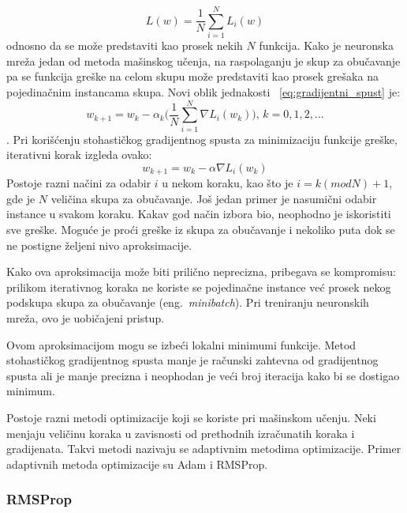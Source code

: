 \begin{equation}
		L(w) = \frac{1}{N}\sum_{i=1}^{N} L_i(w)	
\end{equation}
odnosno da se može predstaviti kao prosek nekih $N$ funkcija. Kako je neuronska mreža jedan od metoda mašinskog učenja, na raspolaganju je skup za obučavanje pa se funkcija greške na celom skupu može predstaviti kao prosek grešaka na pojedinačnim instancama skupa. Novi oblik 
jednakosti ~\eqref{eq:gradijentni_spust} je:
\begin{equation}
	w_{k+1} = w_k - \alpha_k \bigg( \frac{1}{N}\sum_{i=1}^{N} \nabla L_i(w_k) \bigg)\text{,~} k=0,1,2, ... 
\end{equation}.
Pri korišćenju stohastičkog gradijentnog spusta za minimizaciju funkcije greške, iterativni korak izgleda ovako:
\begin{equation}
	w_{k+1} = w_k - \alpha \nabla L_i(w_k) 
\end{equation}
Postoje razni načini za odabir $i$ u nekom koraku, kao što je $i=k (mod N) + 1$, gde je $N$ veličina skupa za obučavanje. Još jedan primer je nasumični odabir instance u svakom koraku. Kakav god način izbora bio, neophodno je iskoristiti sve greške. Moguće je proći greške iz skupa za obučavanje i nekoliko puta dok se ne postigne željeni nivo aproksimacije. 
\par
Kako ova aproksimacija može biti prilično neprecizna, pribegava se kompromisu: prilikom iterativnog koraka ne koriste se pojedinačne instance već prosek nekog podskupa skupa za obučavanje (eng.~{\em minibatch}). Pri treniranju neuronskih mreža, ovo je uobičajeni pristup.
\par
Ovom aproksimacijom mogu se izbeći lokalni minimumi funkcije. Metod stohastičkog gradijentnog spusta manje je računski zahtevna od gradijentnog spusta ali je manje precizna i neophodan je veći broj iteracija kako bi se dostigao minimum.
\par
Postoje razni metodi optimizacije koji se koriste pri mašinskom učenju. Neki menjaju veličinu koraka u zavisnosti od prethodnih izračunatih koraka i gradijenata. Takvi metodi nazivaju se adaptivnim metodima optimizacije. Primer adaptivnih metoda optimizacije su Adam i RMSProp.

\subsubsection{RMSProp}

